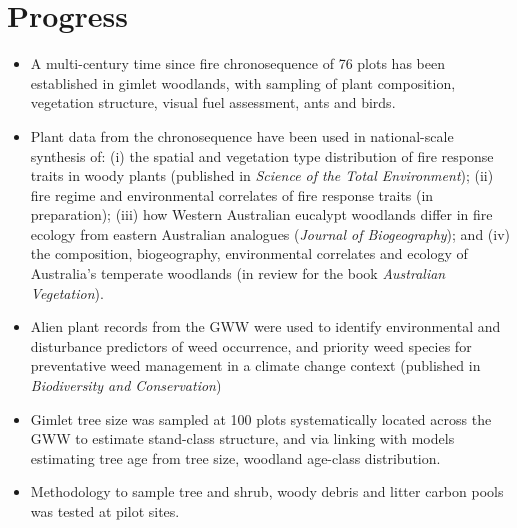 \documentclass[version=last,
    paper=a4, %
    10pt, %
    usenames,
    dvipsnames,
    oneside, %
    headings=openany, %
    DIV=15 %
]{scrbook}
\begin{document}
\section*{Progress}
\begin{itemize}
\itemsep1pt\parskip0pt
\item
  A multi-century time since fire chronosequence of 76 plots has been
  established in gimlet woodlands, with sampling of plant composition,
  vegetation structure, visual fuel assessment, ants and birds.
\item
  Plant data from the chronosequence have been used in national-scale
  synthesis of: (i) the spatial and vegetation type distribution of fire
  response traits in woody plants (published in \emph{Science of the
  Total Environment}); (ii) fire regime and environmental correlates of
  fire response traits (in preparation); (iii) how Western Australian
  eucalypt woodlands differ in fire ecology from eastern Australian
  analogues (\emph{Journal of Biogeography}); and (iv) the composition,
  biogeography, environmental correlates and ecology of Australia's
  temperate woodlands (in review for the book \emph{Australian
  Vegetation}).
\item
  Alien plant records from the GWW were used to identify environmental
  and disturbance predictors of weed occurrence, and priority weed
  species for preventative weed management in a climate change context
  (published in \emph{Biodiversity and Conservation})
\item
  Gimlet tree size was sampled at 100 plots systematically located
  across the GWW to estimate stand-class structure, and via linking with
  models estimating tree age from tree size, woodland age-class
  distribution.
\item
  Methodology to sample tree and shrub, woody debris and litter carbon
  pools was tested at pilot sites.
\end{itemize}
\end{document}
